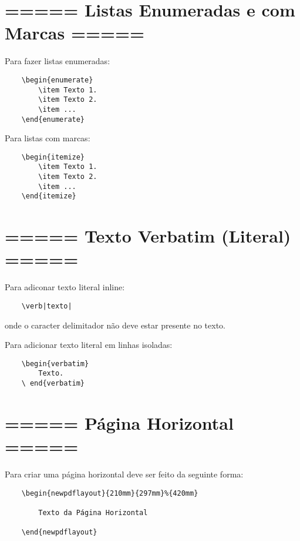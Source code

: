 \section{===== Listas Enumeradas e com Marcas =====}

Para fazer listas enumeradas:

\begin{verbatim}
    \begin{enumerate}
        \item Texto 1.
        \item Texto 2.
        \item ...
    \end{enumerate}
\end{verbatim}

Para listas com marcas:

\begin{verbatim}
    \begin{itemize}
        \item Texto 1.
        \item Texto 2.
        \item ...
    \end{itemize}
\end{verbatim}


\section{===== Texto Verbatim (Literal) =====}

Para adiconar texto literal inline:

\begin{verbatim}
    \verb|texto|
\end{verbatim}

onde o caracter delimitador não deve estar presente no texto.

Para adicionar texto literal em linhas isoladas:

\begin{verbatim}
    \begin{verbatim}
        Texto.
    \ end{verbatim}
\end{verbatim}


\section{===== Página Horizontal =====}

Para criar uma página horizontal deve ser feito da seguinte forma:

\begin{verbatim}
    \begin{newpdflayout}{210mm}{297mm}%{420mm}

        Texto da Página Horizontal

    \end{newpdflayout}
\end{verbatim}
